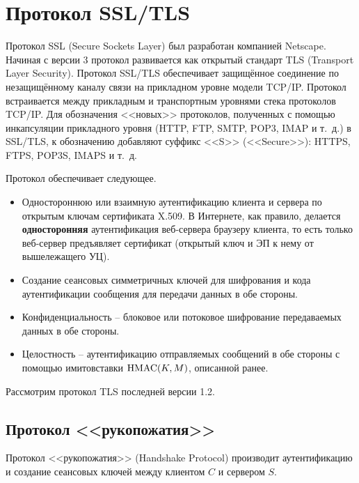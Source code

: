 \section{Протокол SSL/TLS}

Протокол SSL (Secure Sockets Layer) был разработан компанией Netscape. Начиная с версии 3 протокол развивается как открытый стандарт TLS (Transport Layer Security). Протокол SSL/TLS обеспечивает защищённое соединение по незащищённому каналу связи на прикладном уровне модели TCP/IP. Протокол встраивается между прикладным и транспортным уровнями стека протоколов TCP/IP. Для обозначения <<новых>> протоколов, полученных с помощью инкапсуляции прикладного уровня (HTTP, FTP, SMTP, POP3, IMAP и т.~д.) в SSL/TLS, к обозначению добавляют суффикс <<S>> (<<Secure>>): HTTPS, FTPS, POP3S, IMAPS и т.~д.

Протокол обеспечивает следующее.
\begin{itemize}
    \item Одностороннюю или взаимную аутентификацию клиента и сервера по открытым ключам сертификата X.509. В Интернете, как правило, делается \textbf{односторонняя} аутентификация веб-сервера браузеру клиента, то есть только веб-сервер предъявляет сертификат (открытый ключ и ЭП к нему от вышележащего УЦ).
    \item Создание сеансовых симметричных ключей для шифрования и кода аутентификации сообщения для передачи данных в обе стороны.
    \item Конфиденциальность -- блоковое или потоковое шифрование передаваемых данных в обе стороны.
    \item Целостность -- аутентификацию отправляемых сообщений в обе стороны с помощью имитовставки $\textrm{HMAC}(K,M)$, описанной ранее.
\end{itemize}

Рассмотрим протокол TLS последней версии 1.2.


\subsection{Протокол <<рукопожатия>>}

Протокол <<рукопожатия>> (Handshake Protocol) производит аутентификацию и создание сеансовых ключей между клиентом $C$ и сервером $S$.

